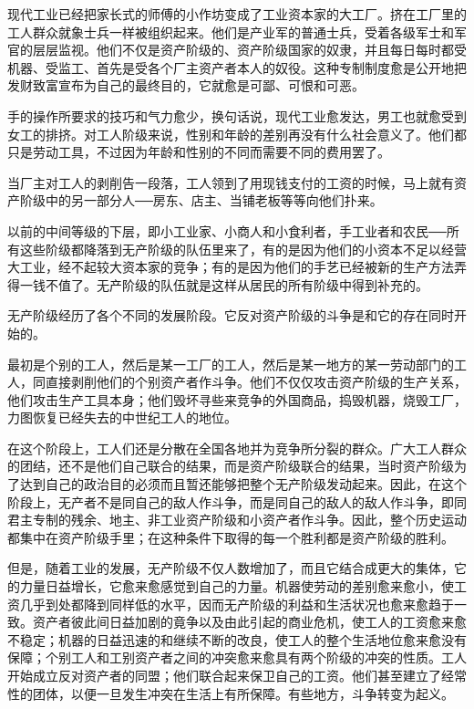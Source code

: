 \documentclass[UTF8]{ctexart}
\begin{document}
现代工业已经把家长式的师傅的小作坊变成了工业资本家的大工厂。挤在工厂里的工人群众就象士兵一样被组织起来。他们是产业军的普通士兵，受着各级军士和军官的层层监视。他们不仅是资产阶级的、资产阶级国家的奴隶，并且每日每时都受机器、受监工、首先是受各个厂主资产者本人的奴役。这种专制制度愈是公开地把发财致富宣布为自己的最终目的，它就愈是可鄙、可恨和可恶。

手的操作所要求的技巧和气力愈少，换句话说，现代工业愈发达，男工也就愈受到女工的排挤。对工人阶级来说，性别和年龄的差别再没有什么社会意义了。他们都只是劳动工具，不过因为年龄和性别的不同而需要不同的费用罢了。

当厂主对工人的剥削告一段落，工人领到了用现钱支付的工资的时候，马上就有资产阶级中的另一部分人──房东、店主、当铺老板等等向他们扑来。

以前的中间等级的下层，即小工业家、小商人和小食利者，手工业者和农民──所有这些阶级都降落到无产阶级的队伍里来了，有的是因为他们的小资本不足以经营大工业，经不起较大资本家的竞争；有的是因为他们的手艺已经被新的生产方法弄得一钱不值了。无产阶级的队伍就是这样从居民的所有阶级中得到补充的。

无产阶级经历了各个不同的发展阶段。它反对资产阶级的斗争是和它的存在同时开始的。

最初是个别的工人，然后是某一工厂的工人，然后是某一地方的某一劳动部门的工人，同直接剥削他们的个别资产者作斗争。他们不仅仅攻击资产阶级的生产关系，他们攻击生产工具本身；他们毁坏寻些来竞争的外国商品，捣毁机器，烧毁工厂，力图恢复已经失去的中世纪工人的地位。

在这个阶段上，工人们还是分散在全国各地并为竞争所分裂的群众。广大工人群众的团结，还不是他们自己联合的结果，而是资产阶级联合的结果，当时资产阶级为了达到自己的政治目的必须而且暂还能够把整个无产阶级发动起来。因此，在这个阶段上，无产者不是同自己的敌人作斗争，而是同自己的敌人的敌人作斗争，即同君主专制的残余、地主、非工业资产阶级和小资产者作斗争。因此，整个历史运动都集中在资产阶级手里；在这种条件下取得的每一个胜利都是资产阶级的胜利。

但是，随着工业的发展，无产阶级不仅人数增加了，而且它结合成更大的集体，它的力量日益增长，它愈来愈感觉到自己的力量。机器使劳动的差别愈来愈小，使工资几乎到处都降到同样低的水平，因而无产阶级的利益和生活状况也愈来愈趋于一致。资产者彼此间日益加剧的竟争以及由此引起的商业危机，使工人的工资愈来愈不稳定；机器的日益迅速的和继续不断的改良，使工人的整个生活地位愈来愈没有保障；个别工人和工别资产者之间的冲突愈来愈具有两个阶级的冲突的性质。工人开始成立反对资产者的同盟；他们联合起来保卫自己的工资。他们甚至建立了经常性的团体，以便一旦发生冲突在生活上有所保障。有些地方，斗争转变为起义。
\end{document}
